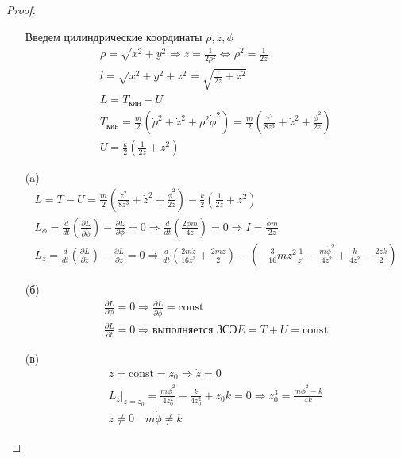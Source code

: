 \begin{proof}
\begin{itemize}
\item[]
    Введем цилиндрические координаты $\rho, z, \phi$
    \begin{gather*}
        \rho = \sqrt{x^2 + y^2} \Rightarrow
        z = \frac{1}{2 \rho^2} \Leftrightarrow \rho^2 = \frac{1}{2z}\\
        l = \sqrt{x^2 + y^2 + z^2} = \sqrt{\frac{1}{2z} + z^2}\\
        L = T_{кин} - U\\
        T_{кин} = \frac{m}{2}(\dot{\rho}^2 + \dot{z}^2 + \rho^2 \dot{\phi}^2)
        = \frac{m}{2}(\frac{\dot{z}^2}{8z^3} + \dot{z}^2 + \frac{\dot{\phi}^2}{2z})\\
        U = \frac{k}{2}(\frac{1}{2z} + z^2)
    \end{gather*}
\item[(a)]
    \begin{gather*}
        L = T - U = \frac{m}{2}(\frac{\dot{z}^2}{8z^3} + \dot{z}^2 + \frac{\dot{\phi}^2}{2z}) - \frac{k}{2}(\frac{1}{2z} + z^2)\\
        L_{\phi} = \frac{d}{dt}(\frac{\partial L}{\partial \dot{\phi}}) - \frac{\partial L}{\partial \phi} = 0 \Rightarrow
        \frac{d}{dt}(\frac{2 \dot{\phi} m}{4z}) = 0 \Rightarrow
        I = \frac{\dot{\phi} m}{2z}\\
        L_{z} = \frac{d}{dt}(\frac{\partial L}{\partial \dot{z}}) - \frac{\partial L}{\partial z} = 0 \Rightarrow
        \frac{d}{dt}(\frac{2m \dot{z}}{16 z^3} + \frac{2 m \dot{z}}{2}) - (-\frac{3}{16} mz^2 \frac{1}{z^4} - \frac{m \dot{\phi}^2}{4z^2} + \frac{k}{4z^2} - \frac{2zk}{2})
    \end{gather*}
\item[(б)]
    \begin{gather*}
        \frac{\partial L}{\partial \phi} = 0 \Rightarrow \frac{\partial L}{\partial \dot{\phi}} = \text{const}\\
        \frac{\partial L}{\partial t} = 0 \Rightarrow \text{выполняется ЗСЭ} E = T + U = \text{const}
    \end{gather*}
\item[(в)]
    \begin{gather*}
        z = \text{const} = z_0 \Rightarrow \dot{z} = 0\\
        L_{z}|_{z = z_0} = \frac{m \dot{\phi}^2}{4z_0^2} - \frac{k}{4z_0^2} + z_0 k = 0 \Rightarrow
        z_0^3 = \frac{m \dot{\phi}^2 - k}{4k}\\
        z \ne 0\quad m \dot{\phi} \ne k
    \end{gather*}
\end{itemize}
\end{proof}
\vskip 0.6in





